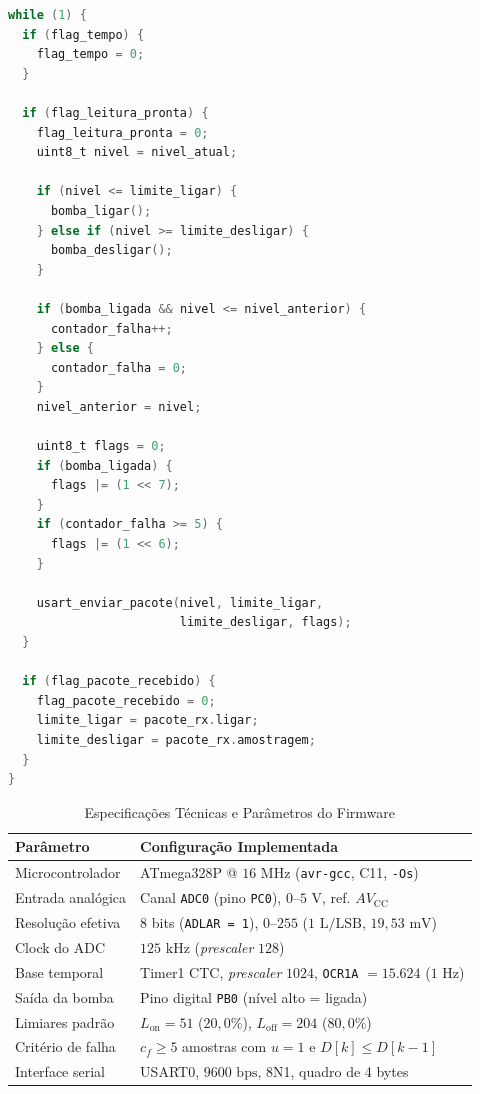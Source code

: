 \documentclass[conference]{IEEEtran}
\begin{document}
\begin{lstlisting}[language=C, float=htbp, caption={Laço principal de controle, detecção de falhas e recepção em \texttt{main.c}.}, label={lst:main_loop}]
while (1) {
  if (flag_tempo) {
    flag_tempo = 0;
  }

  if (flag_leitura_pronta) {
    flag_leitura_pronta = 0;
    uint8_t nivel = nivel_atual;

    if (nivel <= limite_ligar) {
      bomba_ligar();
    } else if (nivel >= limite_desligar) {
      bomba_desligar();
    }

    if (bomba_ligada && nivel <= nivel_anterior) {
      contador_falha++;
    } else {
      contador_falha = 0;
    }
    nivel_anterior = nivel;

    uint8_t flags = 0;
    if (bomba_ligada) {
      flags |= (1 << 7);
    }
    if (contador_falha >= 5) {
      flags |= (1 << 6);
    }

    usart_enviar_pacote(nivel, limite_ligar,
                        limite_desligar, flags);
  }

  if (flag_pacote_recebido) {
    flag_pacote_recebido = 0;
    limite_ligar = pacote_rx.ligar;
    limite_desligar = pacote_rx.amostragem;
  }
}
\end{lstlisting}

\begin{table}[htbp]
	\caption{Especificações Técnicas e Parâmetros do Firmware}
	\label{tab:especificacoes}
	\centering
	\footnotesize
	\setlength{\tabcolsep}{3.5pt}
	\begin{tabularx}{\columnwidth}{@{}lX@{}}
		\toprule
		\textbf{Parâmetro} & \textbf{Configuração Implementada}                                                 \\
		\midrule
		Microcontrolador   & ATmega328P @ $16\text{ MHz}$ (\texttt{avr-gcc}, C11, \texttt{-Os})                 \\
		Entrada analógica  & Canal \texttt{ADC0} (pino \texttt{PC0}), $0$--$5\text{ V}$, ref. $AV_{\text{CC}}$  \\
		Resolução efetiva  & 8 bits (\texttt{ADLAR = 1}), $0$--$255$ ($1\text{ L/LSB}$, $19{,}53\text{ mV}$)    \\
		Clock do ADC       & $125\text{ kHz}$ (\textit{prescaler} $128$)                                        \\
		Base temporal      & Timer1 CTC, \textit{prescaler} $1024$, \texttt{OCR1A} $= 15{.}624$ ($1\text{ Hz}$) \\
		Saída da bomba     & Pino digital \texttt{PB0} (nível alto = ligada)                                    \\
		Limiares padrão    & $L_{\text{on}} = 51$ ($20{,}0\%$), $L_{\text{off}} = 204$ ($80{,}0\%$)             \\
		Critério de falha  & $c_f \ge 5$ amostras com $u = 1$ e $D[k] \le D[k-1]$                               \\
		Interface serial   & USART0, $9600\text{ bps}$, 8N1, quadro de 4 bytes                                  \\
		\bottomrule
	\end{tabularx}
\end{table}
\end{document}
